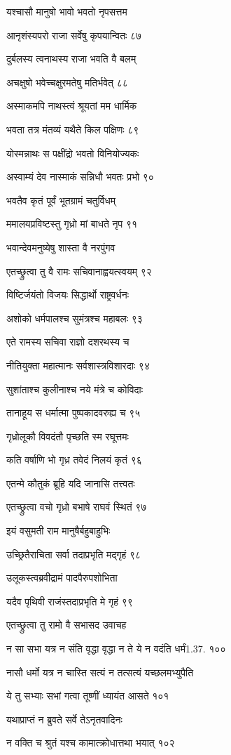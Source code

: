 यश्चासौ मानुषो भावो भवतो नृपसत्तम

आनृशंस्यपरो राजा सर्वेषु कृपयान्वितः ८७

दुर्बलस्य त्वनाथस्य राजा भवति वै बलम्

अचक्षुषो भवेच्चक्षुरमतेषु मतिर्भवेत् ८८

अस्माकमपि नाथस्त्वं श्रूयतां मम धार्मिक

भवता तत्र मंतव्यं यथैते किल पक्षिणः ८९

योस्मन्नाथः स पक्षींद्रो भवतो विनियोज्यकः

अस्वाम्यं देव नास्माकं सन्निधौ भवतः प्रभो ९०

भवतैव कृतं पूर्वं भूतग्रामं चतुर्विधम्

ममालयप्रविष्टस्तु गृध्रो मां बाधते नृप ९१

भवान्देवमनुष्येषु शास्ता वै नरपुंगव

एतच्छ्रुत्वा तु वै रामः सचिवानाह्वयत्स्वयम् ९२

विष्टिर्जयंतो विजयः सिद्धार्थो राष्ट्रवर्धनः

अशोको धर्मपालश्च सुमंत्रश्च महाबलः ९३

एते रामस्य सचिवा राज्ञो दशरथस्य च

नीतियुक्ता महात्मानः सर्वशास्त्रविशारदाः ९४

सुशांताश्च कुलीनाश्च नये मंत्रे च कोविदाः

तानाहूय स धर्मात्मा पुष्पकादवरुह्य च ९५

गृध्रोलूकौ विवदंतौ पृच्छति स्म रघूत्तमः

कति वर्षाणि भो गृध्र तवेदं निलयं कृतं ९६

एतन्मे कौतुकं ब्रूहि यदि जानासि तत्त्वतः

एतच्छ्रुत्वा वचो गृध्रो बभाषे राघवं स्थितं ९७

इयं वसुमती राम मानुषैर्बहुबाहुभिः

उच्छ्रितैराचिता सर्वा तदाप्रभृति मद्गृहं ९८

उलूकस्त्वब्रवीद्रामं पादपैरुपशोभिता

यदैव पृथिवी राजंस्तदाप्रभृति मे गृहं ९९

एतच्छ्रुत्वा तु रामो वै सभासद उवाचह

न सा सभा यत्र न संति वृद्धा वृद्धा न ते ये न वदंति धर्मं1.37. १००

नासौ धर्मो यत्र न चास्ति सत्यं न तत्सत्यं यच्छलमभ्युपैति

ये तु सभ्याः सभां गत्वा तूष्णीं ध्यायंत आसते १०१

यथाप्राप्तं न ब्रुवते सर्वे तेऽनृतवादिनः

न वक्ति च श्रुतं यश्च कामात्क्रोधात्तथा भयात् १०२

